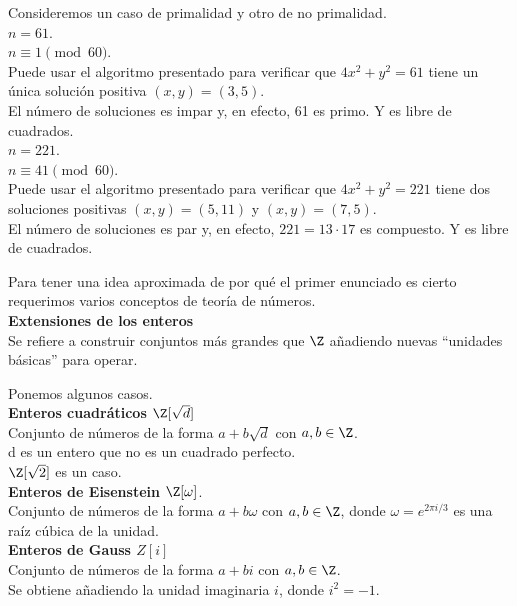 \begin{ejemplo}
Consideremos un caso de primalidad y otro de no primalidad. \\
$n = 61$. \\
$n \equiv 1 \pmod {60}$. \\
Puede usar el algoritmo presentado para verificar que $4x^2+y^2 = 61$ tiene un única solución positiva $(x,y) = (3,5)$. \\
El número de soluciones es impar y, en efecto, 61 es primo. Y es libre de cuadrados. \\
$n = 221$. \\
$n \equiv 41 \pmod {60}$. \\
Puede usar el algoritmo presentado para verificar que $4x^2+y^2 = 221$ tiene dos soluciones positivas $(x,y) = (5,11)$ y $(x,y) = (7,5)$. \\
El número de soluciones es par y, en efecto, $221 = 13 \cdot 17$ es compuesto. Y es libre de cuadrados. \\
\end{ejemplo}

Para tener una idea aproximada de por qué el primer enunciado es cierto requerimos varios conceptos de teoría de números. \\

\textbf{Extensiones de los enteros} \\
Se refiere a construir conjuntos más grandes que $\Z$ añadiendo
nuevas ``unidades básicas'' para operar.

\begin{ejemplo} Ponemos algunos casos. \\
\textbf{Enteros cuadráticos $\Z[\sqrt{d}]$}\\
Conjunto de números de la forma $a+b\sqrt{d}$ con $a,b
  \in \Z$.\\
  d es un entero que no es un cuadrado perfecto.\\
  $\Z[\sqrt{2}]$ es un caso. \\
\textbf{Enteros de Eisenstein $\Z[\omega]$}.\\
  Conjunto de números de la forma $a+b\omega$ con $a,b \in \Z$,
  donde $\omega = e^{2\pi i/3}$ es una raíz cúbica de la unidad.\\
\textbf{Enteros de Gauss $Z[i]$}\\
  Conjunto de números de la forma $a+bi$ con $a,b \in \Z$.\\
  Se obtiene añadiendo la unidad imaginaria $i$, donde $i^2 = -1$.
\end{ejemplo}

